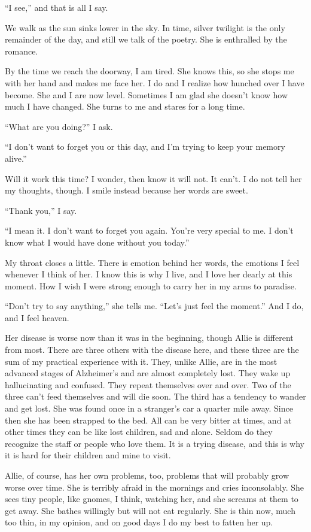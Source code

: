 \documentclass[10pt, twoside, openright]{book}
\begin{document}
``I see,'' and that is all I say.


We walk as the sun sinks lower in the sky. In time, silver twilight is
the only remainder of the day, and still we talk of the poetry. She is
enthralled by the romance.

By the time we reach the doorway, I am tired. She knows this, so she
stops me with her hand and makes me face her. I do and I realize how
hunched over I have become. She and I are now level. Sometimes I am glad
she doesn't know how much I have changed. She turns to me and stares for
a long time.


``What are you doing?'' I ask.


``I don't want to forget you or this day, and I'm trying to keep your
memory alive.''

Will it work this time? I wonder, then know it will not. It can't. I do
not tell her my thoughts, though. I smile instead because her words are
sweet.


``Thank you,'' I say.


``I mean it. I don't want to forget you again. You're very special to
me. I don't know what I would have done without you today.''

My throat closes a little. There is emotion behind her words, the
emotions I feel whenever I think of her. I know this is why I live, and
I love her dearly at this moment. How I wish I were strong enough to
carry her in my arms to paradise.


``Don't try to say anything,'' she tells me. ``Let's just feel the
moment.'' And I do, and I feel heaven.


Her disease is worse now than it was in the beginning, though Allie is
different from most. There are three others with the disease here, and
these three are the sum of my practical experience with it. They, unlike
Allie, are in the most advanced stages of Alzheimer's and are almost
completely lost. They wake up hallucinating and confused. They repeat
themselves over and over. Two of the three can't feed themselves and
will die soon. The third has a tendency to wander and get lost. She was
found once in a stranger's car a quarter mile away. Since then she has
been strapped to the bed. All can be very bitter at times, and at other
times they can be like lost children, sad and alone. Seldom do they
recognize the staff or people who love them. It is a trying disease, and
this is why it is hard for their children and mine to visit.

Allie, of course, has her own problems, too, problems that will probably
grow worse over time. She is terribly afraid in the mornings and cries
inconsolably. She sees tiny people, like gnomes, I think, watching her,
and she screams at them to get away. She bathes willingly but will not
eat regularly. She is thin now, much too thin, in my opinion, and on
good days I do my best to fatten her up.
\end{document}
